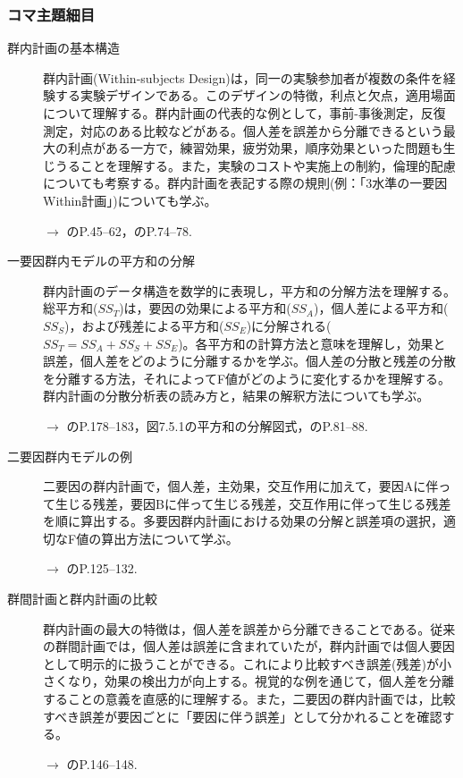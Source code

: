 \subsubsection{コマ主題細目}
\begin{description}
	\item[群内計画の基本構造] 群内計画(Within-subjects Design)は，同一の実験参加者が複数の条件を経験する実験デザインである。このデザインの特徴，利点と欠点，適用場面について理解する。群内計画の代表的な例として，事前-事後測定，反復測定，対応のある比較などがある。個人差を誤差から分離できるという最大の利点がある一方で，練習効果，疲労効果，順序効果といった問題も生じうることを理解する。また，実験のコストや実施上の制約，倫理的配慮についても考察する。群内計画を表記する際の規則(例：「3水準の一要因Within計画」)についても学ぶ。
	      \begin{flushright}
		      $\to$ \textcite{Toyoda201706}のP.45--62，\textcite{kosugi2018}のP.74--78.
	      \end{flushright}

	\item[一要因群内モデルの平方和の分解] 群内計画のデータ構造を数学的に表現し，平方和の分解方法を理解する。総平方和($SS_T$)は，要因の効果による平方和($SS_A$)，個人差による平方和($SS_S$)，および残差による平方和($SS_E$)に分解される($SS_T = SS_A + SS_S + SS_E$)。各平方和の計算方法と意味を理解し，効果と誤差，個人差をどのように分離するかを学ぶ。個人差の分散と残差の分散を分離する方法，それによってF値がどのように変化するかを理解する。群内計画の分散分析表の読み方と，結果の解釈方法についても学ぶ。
	      \begin{flushright}
		      $\to$ \textcite{Yamada2004}のP.178--183，図7.5.1の平方和の分解図式，\textcite{kosugi2018}のP.81--88.
	      \end{flushright}

	\item[二要因群内モデルの例] 二要因の群内計画で，個人差，主効果，交互作用に加えて，要因Aに伴って生じる残差，要因Bに伴って生じる残差，交互作用に伴って生じる残差を順に算出する。多要因群内計画における効果の分解と誤差項の選択，適切なF値の算出方法について学ぶ。
	      \begin{flushright}
		      $\to$ \textcite{kosugi2018}のP.125--132.
	      \end{flushright}

	\item[群間計画と群内計画の比較] 群内計画の最大の特徴は，個人差を誤差から分離できることである。従来の群間計画では，個人差は誤差に含まれていたが，群内計画では個人要因として明示的に扱うことができる。これにより比較すべき誤差(残差)が小さくなり，効果の検出力が向上する。視覚的な例を通じて，個人差を分離することの意義を直感的に理解する。また，二要因の群内計画では，比較すべき誤差が要因ごとに「要因に伴う誤差」として分かれることを確認する。
	      \begin{flushright}
		      $\to$ \textcite{kosugi2019}のP.146--148.
	      \end{flushright}

\end{description}

